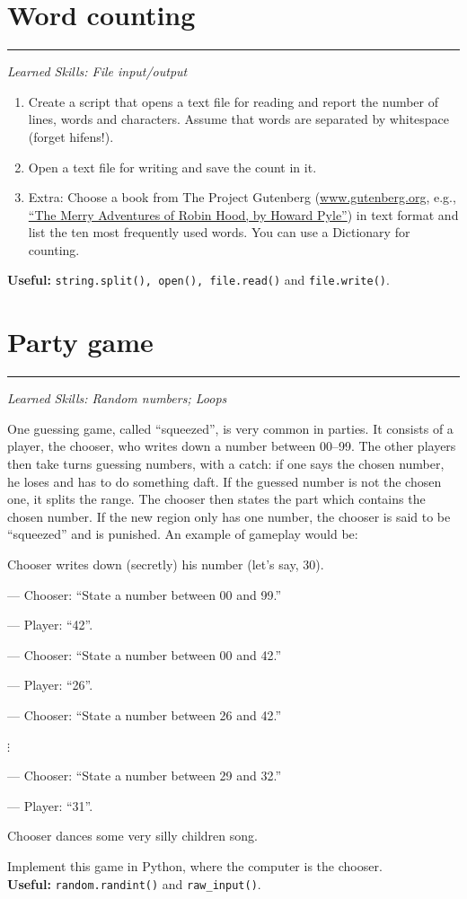 \documentclass[smallheadings,12pt]{scrartcl}
\newcommand{\skills}[1]{\rule{1cm}{0pt}{\begin{minipage}{.8\textwidth}\small\em
      Learned Skills:  #1\end{minipage}}}
\newenvironment{packed_item}{
\begin{itemize}
  \setlength{\itemsep}{1pt}
  \setlength{\parskip}{0pt}
  \setlength{\parsep}{0pt}
}{\end{itemize}}
\begin{document}
\section{Word counting}
\skills{File input/output}
\begin{enumerate}
\item Create a script that opens a text file for reading and report the number of lines,
 words and characters. Assume that words are separated by whitespace (forget hifens!).
\item Open a text file for writing and save the count in it.
\item Extra: Choose a book from The Project Gutenberg
 (\url{www.gutenberg.org}, e.g., \href{http://www.gutenberg.org/cache/epub/964/pg964.txt}{``The Merry Adventures of Robin Hood, by Howard Pyle''}) in
 text format and list the ten most frequently used words. You can use a Dictionary for counting.
\end{enumerate}
\textbf{Useful:} {\tt string.split(), open(), file.read()} and {\tt file.write()}.

\section{Party game}
\skills{Random numbers; Loops}

One guessing game, called ``squeezed'', is very common in
parties. It consists of a player, the chooser,
who writes down a number between 00--99. The other players then take
turns guessing numbers, with a catch: if one says the chosen number,
he loses and has to do something daft. If the guessed number is not the chosen
one, it splits the range. The chooser then states the part which contains
the chosen number. If the new region only has one number, the
chooser is said to be ``squeezed'' and is punished. An example of gameplay would be:
\begin{packed_item}
	\item Chooser writes down (secretly) his number (let's say, 30).
	\item[---] Chooser: ``State a number between 00 and 99.'' 
	\item[---] Player: ``42''.
	\item[---] Chooser: ``State a number between 00 and 42.''
	\item[---] Player: ``26''.
	\item[---] Chooser: ``State a number between 26 and 42.''
	\item[] \hspace{3cm} $\vdots$
	\item[---] Chooser: ``State a number between 29 and 32.''	
	\item[---] Player: ``31''.
	\item Chooser dances some very silly children song.
\end{packed_item}
Implement this game in Python, where the computer is the chooser.\\[2pt]
\textbf{Useful:} {\tt random.randint()} and {\tt raw\_input()}.
\end{document}
